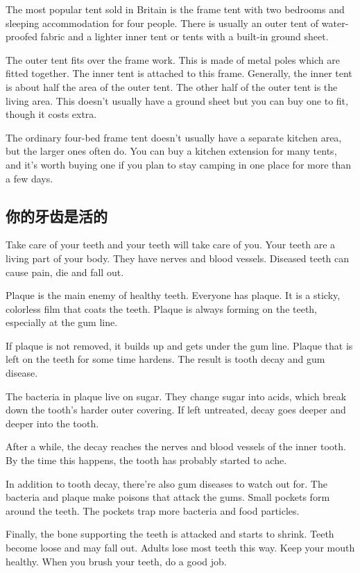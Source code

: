 The most popular tent sold in Britain is the frame
tent with two bedrooms and sleeping accommodation for
four people. There is usually an outer tent of water-
proofed fabric and a lighter inner tent or tents with a
built-in ground sheet.

The outer tent fits over the frame work. This is made of
metal poles which are fitted together. The inner tent is attached
to this frame. Generally, the inner tent is about half
the area of the outer tent. The other half of the outer tent is
the living area. This doesn't usually have a ground sheet
but you can buy one to fit, though it costs extra.

The ordinary four-bed frame tent doesn't usually have a
separate kitchen area, but the larger ones often do. 
You can buy a kitchen extension for many tents, and it's
worth buying one if you plan to stay camping in one place
for more than a few days.
\subsection{你的牙齿是活的}
Take care of your teeth and your teeth will take care of
you. Your teeth are a living part of your body. They
have nerves and blood vessels. Diseased teeth can cause
pain, die and fall out.

Plaque is the main enemy of healthy teeth. Everyone
has plaque. It is a sticky, colorless film that coats the teeth.
Plaque is always forming on the teeth, especially at the
gum line.

If plaque is not removed, it builds up and gets under the
gum line. Plaque that is left on the teeth for some time
hardens. The result is tooth decay and gum disease.

The bacteria in plaque live on sugar. They change
sugar into acids, which break down the tooth's harder
outer covering. If left untreated, decay goes deeper and
deeper into the tooth.

After a while, the decay reaches the nerves and blood
vessels of the inner tooth. By the time this happens, the
tooth has probably started to ache.

In addition to tooth decay, there're also gum diseases
to watch out for. The bacteria and plaque make
poisons that attack the gums. Small pockets form around
the teeth. The pockets trap more bacteria and food particles.

Finally, the bone supporting the teeth is attacked and
starts to shrink. Teeth become loose and may fall out.
Adults lose most teeth this way. Keep your mouth
healthy. When you brush your teeth, do a good job.

